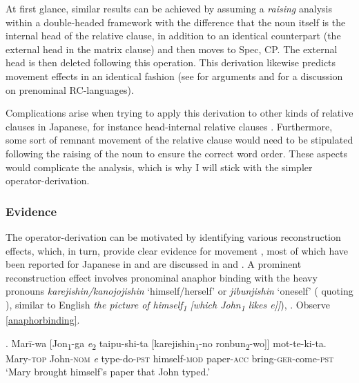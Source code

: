 \documentclass [output=book,colorlinks,citecolor=brown]{langscibook}
\begin{document}
At first glance, similar results can be achieved by assuming a \textit{raising} analysis within a double-headed framework with the difference that the noun itself is the internal head of the relative clause, in addition to an identical counterpart (the external head in the matrix clause) and then moves to Spec, CP. The external head is then deleted following this operation. This derivation likewise predicts movement effects in an identical fashion (see \citealt[22–36]{cinque:2020:relcl} for arguments and \citealt[65–71]{cinque:2020:relcl} for a discussion on prenominal RC-languages).

Complications arise when trying to apply this derivation to other kinds of relative clauses in Japanese, for instance head-internal relative clauses \citep{hiraiwa:2012:mechanism, hiraiwa:2017:a}. Furthermore, some sort of remnant movement of the relative clause would need to be stipulated following the raising of the noun to ensure the correct word order. These aspects would complicate the analysis, which is why I will stick with the simpler operator-derivation. %

\subsubsection{Evidence}

The operator-derivation can be motivated by identifying various reconstruction effects, which, in turn, provide clear evidence for movement \citep{schachter:1973:focus, vries:2002:syntax}, most of which have been reported for Japanese in \citet{ishii:1991:operators} and are discussed in \citet{miyamoto:2017:RC} and \citet{whitman:2013:prehead}. A prominent reconstruction effect involves pronominal anaphor binding with the heavy pronouns \textit{karejishin/kanojojishin} `himself/herself' or \textit{jibunjishin} `oneself' (\citealt[615]{miyamoto:2017:RC} quoting \citealt[29]{ishii:1991:operators}), similar to English \textit{the picture of himself\textsubscript{1} [which John\textsubscript{1} likes e]]}), \citep{salzmann:2017:reconstruction}. Observe \ref{anaphorbinding}. %

\exg. Marī-wa [Jon\textsubscript{1}-ga \textit{e}\textsubscript{2} taipu-shi-ta [karejishin\textsubscript{1}-no ronbun\textsubscript{2}-wo]] mot-te-ki-ta.\\
Mary-\textsc{top} John-\textsc{nom} \textit{e} type-do-\textsc{pst} himself-\textsc{mod} paper-\textsc{acc} bring-\textsc{ger}-come-\textsc{pst}\\
`Mary brought himself's paper that John typed.’ \\ \null \hfill \citep[615]{miyamoto:2017:RC} \label{anaphorbinding}
\end{document}

